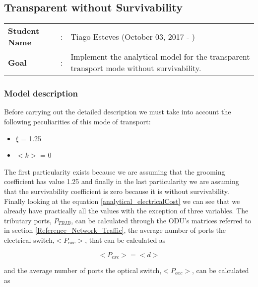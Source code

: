 \clearpage

\subsection{Transparent without Survivability}\label{analytical_Transp_Survivability}
\begin{tcolorbox}	
\begin{tabular}{p{2.75cm} p{0.2cm} p{10.5cm}} 	
\textbf{Student Name}  &:& Tiago Esteves    (October 03, 2017 - )\\
\textbf{Goal}          &:& Implement the analytical model for the transparent transport mode without survivability.
\end{tabular}
\end{tcolorbox}

\subsubsection{Model description}

Before carrying out the detailed description we must take into account the following peculiarities of this mode of transport:
\begin{itemize}
  \item $\xi$ = 1.25
  \item $<k>$ = 0
\end{itemize}

\vspace{11pt}
The first particularity exists because we are assuming that the grooming coefficient has value 1.25 and finally in the last particularity we are assuming that the survivability coefficient is zero because it is without survivability.\\

Finally looking at the equation \ref{analytical_electricalCost} we can see that we already have practically all the values with the exception of three variables. The tributary ports, $P_{TRIB}$, can be calculated through the ODU's matrices referred to in section \ref{Reference_Network_Traffic}, the average number of ports the electrical switch,$<P_{exc}>$, that can be calculated as

\begin{equation}
<P_{exc}> = <d>
\label{Pexc_transp}
\end{equation}

\vspace{11pt}
\noindent
and the average number of ports the optical switch,$<P_{oxc}>$, can be calculated as

